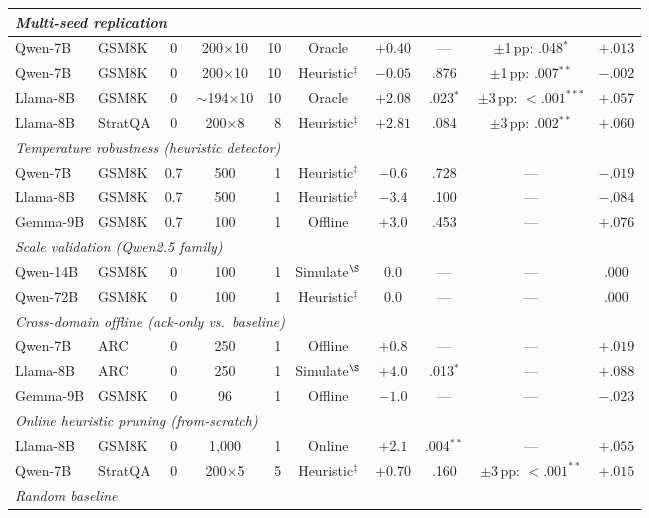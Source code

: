 \begin{table}[ht]
{\begin{tabular}{llccrccccc}
\midrule
\multicolumn{10}{l}{\emph{Multi-seed replication}} \\
\midrule
Qwen-7B & GSM8K & 0 & 200$\times$10 & 10 & Oracle & $+0.40$ & --- & $\pm$1\,pp: .048$^*$ & $+.013$ \\
Qwen-7B & GSM8K & 0 & 200$\times$10 & 10 & Heuristic$^\ddagger$ & $-0.05$ & .876 & $\pm$1\,pp: .007$^{**}$ & $-.002$ \\
Llama-8B & GSM8K & 0 & ${\sim}$194$\times$10 & 10 & Oracle & $+2.08$ & .023$^*$ & $\pm$3\,pp: ${<}.001^{***}$ & $+.057$ \\
Llama-8B & StratQA & 0 & 200$\times$8 & 8 & Heuristic$^\ddagger$ & $+2.81$ & .084 & $\pm$3\,pp: .002$^{**}$ & $+.060$ \\
\midrule
\multicolumn{10}{l}{\emph{Temperature robustness (heuristic detector)}} \\
\midrule
Qwen-7B & GSM8K & 0.7 & 500 & 1 & Heuristic$^\ddagger$ & $-0.6$ & .728 & --- & $-.019$ \\
Llama-8B & GSM8K & 0.7 & 500 & 1 & Heuristic$^\ddagger$ & $-3.4$ & .100 & --- & $-.084$ \\
Gemma-9B & GSM8K & 0.7 & 100 & 1 & Offline & $+3.0$ & .453 & --- & $+.076$ \\
\midrule
\multicolumn{10}{l}{\emph{Scale validation (Qwen2.5 family)}} \\
\midrule
Qwen-14B & GSM8K & 0 & 100 & 1 & Simulate$^\S$ & $0.0$ & --- & --- & $.000$ \\
Qwen-72B & GSM8K & 0 & 100 & 1 & Heuristic$^\ddagger$ & $0.0$ & --- & --- & $.000$ \\
\midrule
\multicolumn{10}{l}{\emph{Cross-domain offline (ack-only vs.\ baseline)}} \\
\midrule
Qwen-7B & ARC & 0 & 250 & 1 & Offline & $+0.8$ & --- & --- & $+.019$ \\
Llama-8B & ARC & 0 & 250 & 1 & Simulate$^\S$ & $+4.0$ & .013$^*$ & --- & $+.088$ \\
Gemma-9B & GSM8K & 0 & 96 & 1 & Offline & $-1.0$ & --- & --- & $-.023$ \\
\midrule
\multicolumn{10}{l}{\emph{Online heuristic pruning (from-scratch)}} \\
\midrule
Llama-8B & GSM8K & 0 & 1{,}000 & 1 & Online & $+2.1$ & .004$^{**}$ & --- & $+.055$ \\
Qwen-7B & StratQA & 0 & 200$\times$5 & 5 & Heuristic$^\ddagger$ & $+0.70$ & .160 & $\pm$3\,pp: ${<}.001^{**}$ & $+.015$ \\
\midrule
\multicolumn{10}{l}{\emph{Random baseline}} \\

\end{tabular}}
\end{table}
